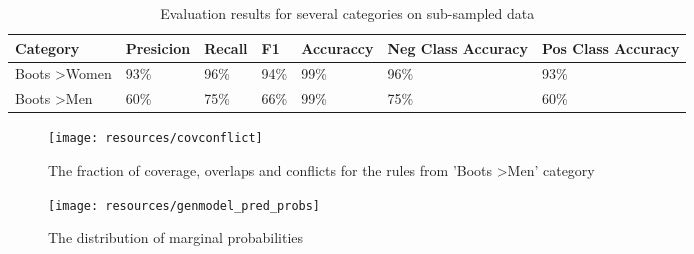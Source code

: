 \begin{table*}
  \caption{Evaluation results for several categories on sub-sampled data}
  \label{tab:evaluation}
  \begin{tabular}{lllllll}
    \toprule
    Category & Presicion & Recall & F1 & Accuraccy & Neg Class Accuracy & Pos Class Accuracy\\
    \midrule
    Boots \textgreater Women  & 93\% & 96\% & 94\% & 99\% & 96\% & 93\% \\
    Boots \textgreater Men &  60\%  & 75\% & 66\% & 99\% & 75\% & 60\% \\
    \bottomrule
  \end{tabular}
\end{table*}

\begin{figure}[th]
   \texttt{[image: resources/covconflict]}
   \caption{The fraction of coverage, overlaps and conflicts for the rules from 'Boots \textgreater Men' category}
   \label{fig:covconflict}
   \centering
\end{figure}
\begin{figure}[th]
   \texttt{[image: resources/genmodel\_pred\_probs]}
   \caption{The distribution of marginal probabilities}
   \label{fig:genmodel_pred_probs}
   \centering
\end{figure}

